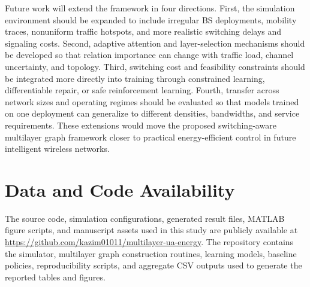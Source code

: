 \documentclass[journal]{IEEEtran}
\begin{document}
Future work will extend the framework in four directions. First, the
simulation environment should be expanded to include irregular BS deployments,
mobility traces, nonuniform traffic hotspots, and more realistic switching
delays and signaling costs. Second, adaptive attention and layer-selection
mechanisms should be developed so that relation importance can change with
traffic load, channel uncertainty, and topology. Third, switching cost and
feasibility constraints should be integrated more directly into training
through constrained learning, differentiable repair, or safe reinforcement
learning. Fourth, transfer across network sizes and operating regimes should be
evaluated so that models trained on one deployment can generalize to different
densities, bandwidths, and service requirements. These extensions would move
the proposed switching-aware multilayer graph framework closer to practical
energy-efficient control in future intelligent wireless networks.

\section*{Data and Code Availability}
The source code, simulation configurations, generated result files, MATLAB
figure scripts, and manuscript assets used in this study are publicly available
at \url{https://github.com/kazim01011/multilayer-ua-energy}. The repository
contains the simulator, multilayer graph construction routines, learning
models, baseline policies, reproducibility scripts, and aggregate CSV outputs
used to generate the reported tables and figures.



\end{document}
